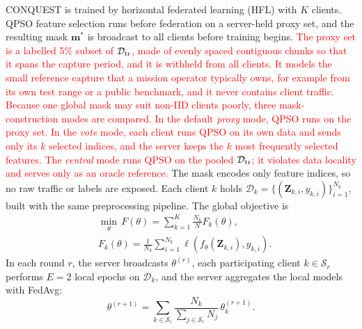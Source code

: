 \documentclass[conference]{IEEEtran}
\begin{document}
CONQUEST is trained by horizontal federated learning (HFL) with $K$
clients. QPSO feature selection runs before federation on a
server-held proxy set, and the resulting mask $\mathbf{m}^{*}$ is
broadcast to all clients before training begins.
\textcolor{red}{The proxy set is a labelled 5\% subset of
$\mathcal{D}_{\rm tr}$, made of evenly spaced contiguous chunks so
that it spans the capture period, and it is withheld from all
clients. It models the small reference capture that a mission
operator typically owns, for example from its own test range or a
public benchmark, and it never contains client traffic. Because one
global mask may suit non-IID clients poorly, three mask-construction
modes are compared. In the default \textit{proxy} mode, QPSO runs on
the proxy set. In the \textit{vote} mode, each client runs QPSO on its
own data and sends only its $k$ selected indices, and the server
keeps the $k$ most frequently selected features. The
\textit{central} mode runs QPSO on the pooled $\mathcal{D}_{\rm tr}$;
it violates data locality and serves only as an oracle reference.}
The mask encodes only feature indices, so no raw traffic or labels
are exposed. Each client $k$ holds
$\mathcal{D}_k=\{(\mathbf{Z}_{k,i},y_{k,i})\}_{i=1}^{N_k}$, built with
the same preprocessing pipeline. The global objective is
\begin{equation}
\begin{aligned}
&\min_{\theta}\,F(\theta)=\sum_{k=1}^{K}\frac{N_k}{N}F_k(\theta),\\
&F_k(\theta)=\frac{1}{N_k}\sum_{i=1}^{N_k}
\ell\!\left(f_\theta(\mathbf{Z}_{k,i}),y_{k,i}\right).
\end{aligned}
\label{eq:hfl_objective}
\end{equation}
In each round $r$, the server broadcasts $\theta^{(r)}$, each
participating client $k\in\mathcal{S}_r$ performs $E=2$ local epochs
on $\mathcal{D}_k$, and the server aggregates the local models with
FedAvg:
\begin{equation}
\theta^{(r+1)}=\sum_{k\in\mathcal{S}_r}
\frac{N_k}{\sum_{j\in\mathcal{S}_r}N_j}
\,\theta_k^{(r+1)}.
\label{eq:fedavg}
\end{equation}
\end{document}
